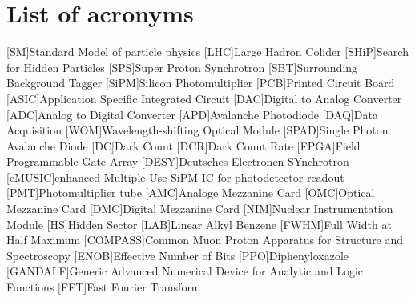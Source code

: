 \documentclass[listof=totoc,bibliography=totocnumbered,a4paper,english,12pt,twoside]{report}
\begin{document}
\onehalfspacing





\newpage
\thispagestyle{empty}
\mbox{}\newpage
{}

\thispagestyle{empty}
\mbox{}\newpage
\thispagestyle{empty}


\thispagestyle{empty}
\newpage
\thispagestyle{empty}
\mbox{}\newpage

\setcounter{page}{1}
\tableofcontents

\newpage







\appendix

\chapter{List of acronyms}
\begin{acronym}[SiPM]
    [SM]{Standard Model of particle physics}
    [LHC]{Large Hadron Colider}
    [SHiP]{Search for Hidden Particles}
    [SPS]{Super Proton Synchrotron}
    [SBT]{Surrounding Background Tagger}
    [SiPM]{Silicon Photomultiplier}
    [PCB]{Printed Circuit Board}
    [ASIC]{Application Specific Integrated Circuit}
    [DAC]{Digital to Analog Converter}
    [ADC]{Analog to Digital Converter}
    [APD]{Avalanche Photodiode}
    [DAQ]{Data Acquisition}
    [WOM]{Wavelength-shifting Optical Module}
    [SPAD]{Single Photon Avalanche Diode}
    [DC]{Dark Count}
    [DCR]{Dark Count Rate}
    [FPGA]{Field Programmable Gate Array}
    [DESY]{Deutsches Electronen SYnchrotron}
    [eMUSIC]{enhanced Multiple Use SiPM IC for photodetector readout}
    [PMT]{Photomultiplier tube}
    [AMC]{Analoge Mezzanine Card}
    [OMC]{Optical Mezzanine Card}
    [DMC]{Digital Mezzanine Card}
    [NIM]{Nuclear Instrumentation Module}
    [HS]{Hidden Sector}
    [LAB]{Linear Alkyl Benzene}
    [FWHM]{Full Width at Half Maximum}
    [COMPASS]{Common Muon Proton Apparatus for Structure and Spectroscopy}
    [ENOB]{Effective Number of Bits}
    [PPO]{Diphenyloxazole}
    [GANDALF]{Generic Advanced Numerical Device for Analytic and Logic Functions}
    [FFT]{Fast Fourier Transform}
\end{acronym}
\end{document}
